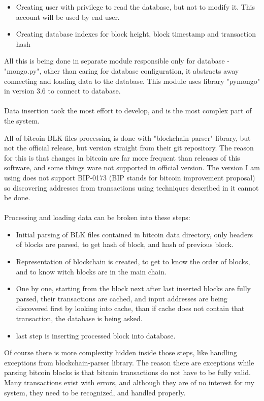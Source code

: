 \documentclass[12pt, en, eng]{mgr}
\begin{document}
\begin{itemize}
\item
Creating user with privilege to read the database, but not to modify it. This account will be used by end user.
\item
Creating database indexes for block height, block timestamp and transaction hash
\end{itemize}

All this is being done in separate module responsible only for database - "mongo.py", other than caring for database configuration, it abstracts away connecting and loading data to the database. This module uses library "pymongo" in version 3.6 to connect to database.
\\
\\  
Data insertion took the most effort to develop, and is the most complex part of the system.

All of bitcoin BLK files processing is done with "blockchain-parser" library, but not the official release, but version straight from their git repository. The reason for this is that changes in bitcoin are far more frequent than releases of this software, and some things ware not supported in official version. The version I am using does not support BIP-0173 (BIP stands for bitcoin improvement proposal) so discovering addresses from transactions using techniques described in it cannot be done. 
\\
\\
Processing and loading data can be broken into these steps:
\begin{itemize}
\item
Initial parsing of BLK files contained in bitcoin data directory, only headers of blocks are parsed, to get hash of block, and hash of previous block.
\item
Representation of blockchain is created, to get to know the order of blocks, and to know witch blocks are in the main chain.
\item
One by one, starting from the block next after last inserted blocks are fully parsed, their transactions are cached, and input addresses are being discovered first by looking into cache, than if cache does not contain that transaction, the database is being asked.
\item
last step is inserting processed block into database.
\end{itemize}

Of course there is more complexity hidden inside those steps, like handling exceptions from blockchain-parser library. The reason there are exceptions while parsing bitcoin blocks is that bitcoin transactions do not have to be fully valid. Many transactions exist with errors, and although they are of no interest for my system, they need to be recognized, and handled properly.
\end{document}
